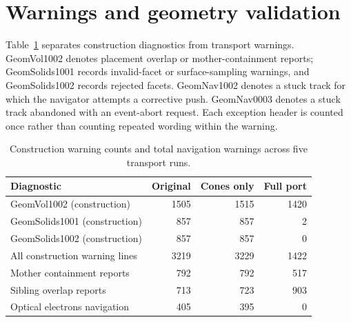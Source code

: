 \FloatBarrier

\section{Warnings and geometry validation}

Table~\ref{tab:4} separates construction diagnostics from transport warnings. GeomVol1002 denotes placement
overlap or mother-containment reports; GeomSolids1001 records invalid-facet or surface-sampling warnings, and
GeomSolids1002 records rejected facets. GeomNav1002 denotes a stuck track for which the navigator attempts a
corrective push. GeomNav0003 denotes a stuck track abandoned with an event-abort request. Each exception header
is counted once rather than counting repeated wording within the warning.

\begin{table}[htbp]

\caption{Construction warning counts and total navigation warnings across five transport runs.}

\label{tab:4}

\centering

\small

\setlength{\tabcolsep}{4pt}

\renewcommand{\arraystretch}{1.15}

\begin{tabularx}{\textwidth}{@{}Xrrr@{}}

\toprule

Diagnostic & Original & Cones only & Full port \\

\midrule

GeomVol1002 (construction) & 1505 & 1515 & 1420 \\

GeomSolids1001 (construction) & 857 & 857 & 2 \\

GeomSolids1002 (construction) & 857 & 857 & 0 \\

All construction warning lines & 3219 & 3229 & 1422 \\

Mother containment reports & 792 & 792 & 517 \\

Sibling overlap reports & 713 & 723 & 903 \\

Optical electrons navigation & 405 & 395 & 0 \\


\end{tabularx}
\end{table}
